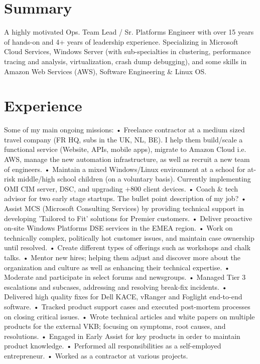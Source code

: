 \documentclass[11pt,a4paper,sans]{moderncv}
\begin{document}
\makecvtitle

\section{Summary}
{
  A highly motivated Ops. Team Lead / Sr. Platforms Engineer with 
  over 15 years of hands-on and 4+ years of leadership experience. 
  Specializing in Microsoft Cloud Services, Windows Server (with 
  sub-specialties in clustering, performance tracing and analysis,
  virtualization, crash dump debugging), and some skills in Amazon
  Web Services (AWS), Software Engineering & Linux OS.
}
\section{Experience}
{
  Some of my main ongoing missions:
• Freelance contractor at a medium sized travel company (FR HQ, subs in the UK, NL, BE). 
  I help them build/scale a functional service (Website, APIs, mobile apps), migrate to Amazon Cloud 
  i.e. AWS, manage the new automation infrastructure, as well as recruit a new team of engineers.
• Maintain a mixed Windows/Linux environment at a school for at-risk middle/high school children (on a voluntary basis). 
  Currently implementing OMI CIM server, DSC, and upgrading +800 client devices.
• Coach & tech advisor for two early stage startups.
}
{
  The bullet point description of my job?
• Assist MCS (Microsoft Consulting Services) by providing technical support in developing 'Tailored to Fit' solutions for Premier customers.
• Deliver proactive on-site Windows Platforms DSE services in the EMEA region.
• Work on technically complex, politically hot customer issues, and maintain case ownership until resolved.
• Create different types of offerings such as workshops and chalk talks.
• Mentor new hires; helping them adjust and discover more about the organization and culture as well as enhancing their technical expertise.
• Moderate and participate in select forums and newsgroups.
}
{
• Managed Tier 3 escalations and subcases, addressing and resolving break-fix incidents.
• Delivered high quality fixes for Dell KACE, vRanger and Foglight end-to-end software.
}
{
• Tracked product support cases and executed post-mortem processes on closing critical issues.
• Wrote technical articles and white papers on multiple products for the external VKB; focusing on symptoms, root causes, and resolutions.
• Engaged in Early Assist for key products in order to maintain product knowledge.
}
{
• Performed all responsibilities as a self-employed entrepreneur.
• Worked as a contractor at various projects.
}
\end{document}

